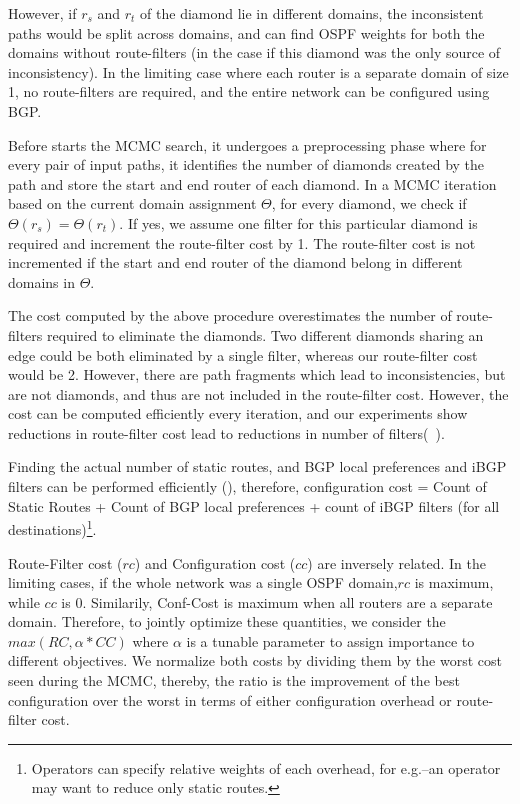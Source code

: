 However, if $r_s$ and $r_t$ of the diamond lie in
different domains, the inconsistent paths would be split 
across domains, and \name can find OSPF weights for
both the domains without route-filters (in the case if this
diamond was the only source of inconsistency). In the limiting
case where each router is a separate domain of size 1,
no route-filters are required, and the entire 
network can be configured using BGP. 

Before \name starts the MCMC search, it undergoes a preprocessing phase 
where for every pair of input paths, it identifies the
number of diamonds created by the path 
and store the start and end router of 
each diamond. In a MCMC iteration based on the current 
domain assignment $\Theta$, for every diamond, we check if 
$\Theta(r_s) = \Theta(r_t)$. If yes, 
we assume one filter for this particular
diamond is required and increment the route-filter cost by 1. The 
route-filter cost is not incremented if the start and end 
router of the diamond belong in different domains in $\Theta$.

The cost computed by the above procedure overestimates the
number of route-filters required to eliminate the diamonds.  
Two different diamonds sharing an edge could be both 
eliminated by a single filter, whereas our route-filter cost 
would be 2. However, there are path fragments which 
lead to inconsistencies, but are not diamonds, and thus
are not included in the route-filter cost. However, the 
cost can be computed efficiently every iteration, and 
our experiments show reductions in route-filter cost 
lead to reductions in number of filters(~). 

Finding the actual number of static routes, and 
BGP local preferences and iBGP filters can be performed 
efficiently (), therefore, 
configuration cost = Count of Static Routes + Count of 
BGP local preferences + count of iBGP filters 
(for all destinations)\footnote{
	Operators can specify relative weights of each overhead, for e.g.--an
	operator may want to reduce only static routes.}.

Route-Filter cost ($rc$) and Configuration cost ($cc$) 
are inversely related. In the limiting cases,
if the whole network was a single OSPF domain,$rc$ is maximum, while
$cc$ is 0. Similarily, Conf-Cost is maximum when all routers are a
separate domain. Therefore, to jointly optimize these quantities, we
consider the $max(RC, \alpha*CC)$ where $\alpha$ is a tunable parameter
to assign importance to different objectives. We normalize
both costs by dividing them by the worst cost seen during the MCMC,
thereby, the ratio is the improvement of the best configuration over
the worst in terms of either configuration overhead or route-filter cost.